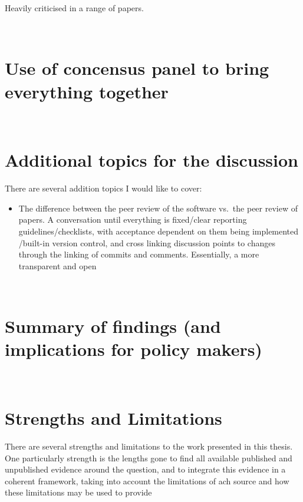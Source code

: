 \documentclass[a4paper, twoside]{templates/ociamthesis}
\providecommand{\tightlist}{%
  \setlength{\itemsep}{0pt}\setlength{\parskip}{0pt}}
\begin{document}
Heavily criticised in a range of papers.

~

\hypertarget{use-of-concensus-panel-to-bring-everything-together}{%
\section{Use of concensus panel to bring everything together}\label{use-of-concensus-panel-to-bring-everything-together}}

~

\hypertarget{additional-topics-for-the-discussion}{%
\section{Additional topics for the discussion}\label{additional-topics-for-the-discussion}}

There are several addition topics I would like to cover:

\begin{itemize}
\tightlist
\item
  The difference between the peer review of the software vs.~the peer review of papers. A conversation until everything is fixed/clear reporting guidelines/checklists, with acceptance dependent on them being implemented /built-in version control, and cross linking discussion points to changes through the linking of commits and comments. Essentially, a more transparent and open
\end{itemize}

~

\hypertarget{summary-of-findings-and-implications-for-policy-makers}{%
\section{Summary of findings (and implications for policy makers)}\label{summary-of-findings-and-implications-for-policy-makers}}

~

\hypertarget{strengths-and-limitations-2}{%
\section{Strengths and Limitations}\label{strengths-and-limitations-2}}

There are several strengths and limitations to the work presented in this thesis. One particularly strength is the lengths gone to find all available published and unpublished evidence around the question, and to integrate this evidence in a coherent framework, taking into account the limitations of ach source and how these limitations may be used to provide
\end{document}
